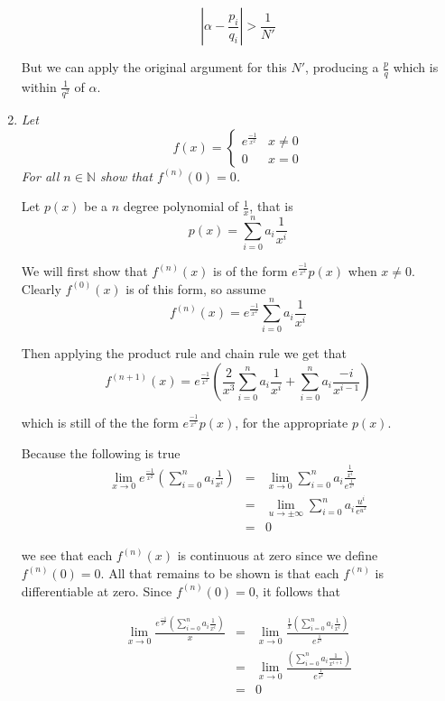 \documentclass[11pt]{article}
\begin{document}
\begin{enumerate}
\[|\alpha - \frac{p_i}{q_i}| > \frac{1}{N'}\]

But we can apply the original argument for this $N'$, producing a $\frac{p}{q}$ which is within $\frac{1}{q^2}$ of $\alpha$.

\item \emph{Let \[f(x) = \begin{cases} e^{\frac{-1}{x^2}} & x \neq 0 \\ 0 & x = 0 \end{cases}\]  For all $n \in \mathbb{N}$ show that $f^{(n)}(0) = 0$.}

Let $p(x)$ be a $n$ degree polynomial of $\frac{1}{x}$, that is
\[
p(x) = \sum_{i=0}^n a_i\frac{1}{x^i}
\]

We will first show that $f^{(n)}(x)$ is of the form $e^{\frac{-1}{x^2}}p(x)$ when $x \neq 0$.  Clearly $f^{(0)}(x)$ is of this form, so assume 
\[
f^{(n)}(x) = e^{\frac{-1}{x^2}}\sum_{i=0}^n a_i\frac{1}{x^i}
\]

Then applying the product rule and chain rule we get that
\[
f^{(n+1)}(x) = e^{\frac{-1}{x^2}}\left(\frac{2}{x^3}\sum_{i=0}^n a_i\frac{1}{x^i} + \sum_{i=0}^n a_i\frac{-i}{x^{i-1}}\right)
\]

which is still of the the form $e^{\frac{-1}{x^2}}p(x)$, for the appropriate $p(x)$.

Because the following is true
\begin{eqnarray*}
\lim_{x \rightarrow 0} e^{\frac{-1}{x^2}} \left(\sum_{i=0}^n a_i \frac{1}{x^i} \right) &=& \lim_{x \rightarrow 0}\sum_{i=0}^n a_i \frac{\frac{1}{x^i}}{e^{\frac{1}{x^2}}} \\
&=& \lim_{u \rightarrow \pm \infty}\sum_{i=0}^n a_i \frac{u^i}{e^{u^2}} \\
&=& 0
\end{eqnarray*}

we see that each $f^{(n)}(x)$ is continuous at zero since we define $f^{(n)}(0) = 0$.  All that remains to be shown is that each $f^{(n)}$ is differentiable at zero.  Since $f^{(n)}(0) = 0$, it follows that 

\begin{eqnarray*}
\lim_{x \rightarrow 0} \frac{e^{\frac{-1}{x^2}} \left(\sum_{i=0}^n a_i \frac{1}{x^i} \right)}{x} &=& \lim_{x \rightarrow 0} \frac{\frac{1}{x}\left(\sum_{i=0}^n a_i \frac{1}{x^i} \right)}{e^\frac{1}{x^2}} \\
&=& \lim_{x \rightarrow 0} \frac{\left(\sum_{i=0}^n a_i \frac{1}{x^{i+1}} \right)}{e^\frac{1}{x^2}} \\
&=& 0
\end{eqnarray*}


\end{enumerate}
\end{document}
